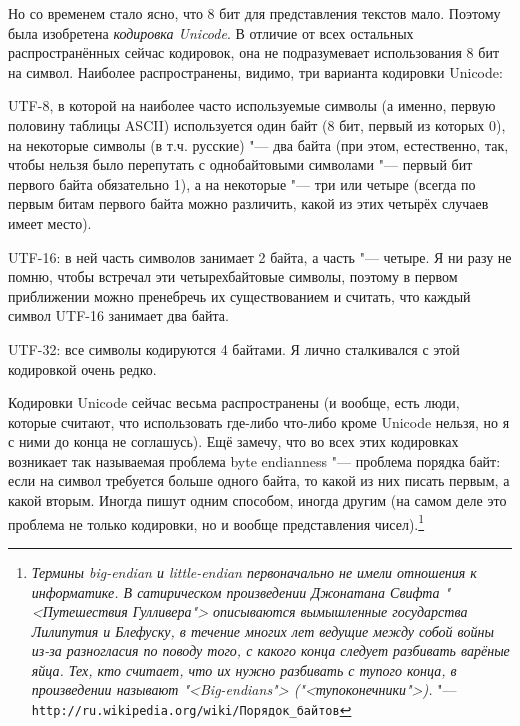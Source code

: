Но со временем стало ясно, что 8 бит для представления текстов мало. Поэтому была изобретена 
\textit{кодировка Unicode}. В отличие от всех остальных распространённых сейчас кодировок, она не подразумевает 
использования 8 бит на символ.  Наиболее распространены, видимо, три варианта кодировки Unicode: 
\begin{ulist}
\item UTF-8, в которой на наиболее часто используемые символы (а именно, первую половину таблицы ASCII) 
используется один байт (8 бит, первый из которых 0), на некоторые символы (в т.ч. русские) "--- два байта (при этом, 
естественно, так, чтобы нельзя было перепутать с однобайтовыми символами "--- первый бит первого 
байта обязательно 1), а на некоторые "--- три или четыре (всегда по первым битам первого байта можно 
различить, какой из этих четырёх случаев имеет место). 
\item UTF-16: в ней часть символов занимает 2 байта, а часть "--- четыре. Я ни разу не помню, чтобы 
встречал эти четырехбайтовые символы, поэтому в первом приближении можно пренебречь их 
существованием и считать, что каждый символ UTF-16 занимает два байта.
\item UTF-32: все символы кодируются 4 байтами. Я лично сталкивался с этой кодировкой очень редко.
\end{ulist}
Кодировки Unicode сейчас весьма распространены (и вообще, есть люди, которые считают, что использовать
где-либо что-либо кроме Unicode нельзя, но я с ними до конца не соглашусь). Ещё замечу, что во всех 
этих кодировках возникает так называемая проблема 
byte endianness "--- проблема порядка байт: если на символ требуется больше одного байта, то какой 
из них писать первым, а какой вторым. Иногда пишут одним способом, иногда другим (на самом деле это 
проблема не только кодировки, но и вообще представления чисел).\footnote{\textit{Термины big-endian и little-endian первоначально не имели отношения к информатике. 
В сатирическом произведении Джонатана Свифта "<Путешествия Гулливера"> описываются вымышленные 
государства Лилипутия и Блефуску, в течение многих лет ведущие между собой войны из-за разногласия 
по поводу того, с какого конца следует разбивать варёные яйца. Тех, кто считает, что их нужно 
разбивать с тупого конца, в произведении называют "<Big-endians"> ("<тупоконечники">).} "--- 
\texttt{http://ru.wikipedia.org/wiki/Порядок\_байтов}}

